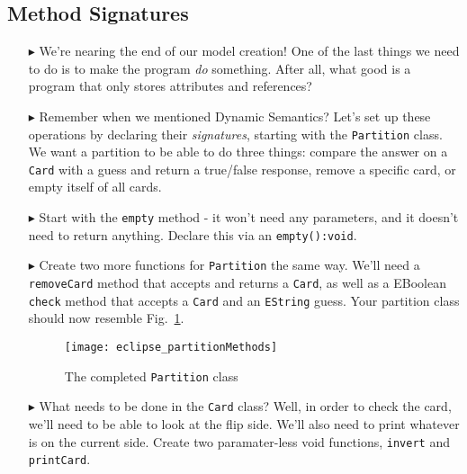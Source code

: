\newpage
\subsection{Method Signatures}
\texHeader
\hypertarget{static:methods tex}{}

\begin{itemize}

\item[$\blacktriangleright$] We're nearing the end of our model creation! One of the last things we need to do is to make the program \emph{do} something. After
all, what good is a program that only stores attributes and references?

\item[$\blacktriangleright$] Remember when we mentioned Dynamic Semantics? Let's set up these operations by declaring their \emph{signatures}, starting with the
\texttt{Partition} class. We want a partition to be able to do three things: compare the answer on a \texttt{Card} with a guess and return a true/false
response, remove a specific card, or empty itself of all cards.

\item[$\blacktriangleright$] Start with the \texttt{empty} method - it won't need any parameters, and it doesn't need to return anything. Declare this via an
\texttt{empty():void}.

\item[$\blacktriangleright$] Create two more functions for \texttt{Partition} the same way. We'll need a \texttt{removeCard} method that accepts and returns a
\texttt{Card}, as well as a EBoolean \texttt{check} method that accepts a \texttt{Card} and an \texttt{EString} guess. Your partition class should now resemble
Fig.~\ref{fig:partitionMethods}.

\begin{figure}[htbp]
	\centering
  \texttt{[image: eclipse\_partitionMethods]}
	\caption{The completed \texttt{Partition} class}
	\label{fig:partitionMethods}
\end{figure}

\item[$\blacktriangleright$] What needs to be done in the \texttt{Card} class? Well, in order to check the card, we'll need to be able to look at the flip side.
We'll also need to print whatever is on the current side. Create two paramater-less void functions, \texttt{invert} and \texttt{printCard}.


\end{itemize}
